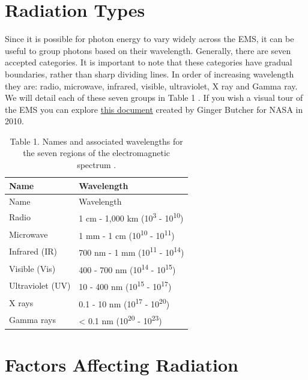 \documentclass[
]{book}
\begin{document}
\section{Radiation Types}\label{radiation-types}

Since it is possible for photon energy to vary widely across the EMS, it can be useful to group photons based on their wavelength. Generally, there are seven accepted categories. It is important to note that these categories have gradual boundaries, rather than sharp dividing lines. In order of increasing wavelength they are: radio, microwave, infrared, visible, ultraviolet, X ray and Gamma ray. We will detail each of these seven groups in Table 1 \citep{zwinkels_encyclopedia_2020}. If you wish a visual tour of the EMS you can explore \href{https://books.google.ca/books?id=DfLPpxogdM4C&pg=PP1\#v=onepage&q&f=false}{this document} created by Ginger Butcher for NASA in 2010.

\begin{longtable}[]{@{}ll@{}}
\caption{Table 1. Names and associated wavelengths for the seven regions of the electromagnetic spectrum \citep{zwinkels_encyclopedia_2020}.}\tabularnewline
\toprule\noalign{}
Name & Wavelength \\
\midrule\noalign{}
\endfirsthead
\toprule\noalign{}
Name & Wavelength \\
\midrule\noalign{}
\endhead
\bottomrule\noalign{}
\endlastfoot
Radio & 1 cm - 1,000 km (10\textsuperscript{3} - 10\textsuperscript{10}) \\
Microwave & 1 mm - 1 cm (10\textsuperscript{10} - 10\textsuperscript{11}) \\
Infrared (IR) & 700 nm - 1 mm (10\textsuperscript{11} - 10\textsuperscript{14}) \\
Visible (Vis) & 400 - 700 nm (10\textsuperscript{14} - 10\textsuperscript{15}) \\
Ultraviolet (UV) & 10 - 400 nm (10\textsuperscript{15} - 10\textsuperscript{17}) \\
X rays & 0.1 - 10 nm (10\textsuperscript{17} - 10\textsuperscript{20}) \\
Gamma rays & \textless{} 0.1 nm (10\textsuperscript{20} - 10\textsuperscript{23}) \\
\end{longtable}

\section{Factors Affecting Radiation}\label{factors-affecting-radiation}
\end{document}
